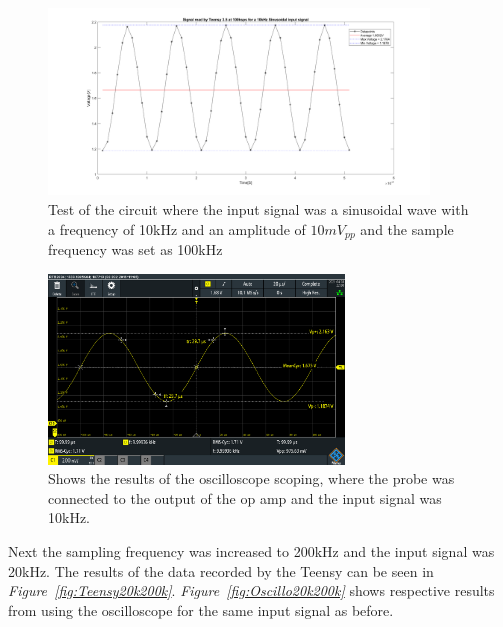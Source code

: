 \begin{figure}[h]
    \centering
    \includegraphics[width=0.9\textwidth]{graphics/10kin_100ksampl.png}
    \caption{Test of the circuit where the input signal was a sinusoidal wave with a frequency of 10kHz and an amplitude of $10mV_{pp}$ and the sample frequency was set as 100kHz}
    \label{fig:Teensy10k100k}
\end{figure}

\begin{figure}[h]
    \centering
    \includegraphics[width=0.7\textwidth]{graphics/10k10mvPP100ksamp.PNG}
    \caption{Shows the results of the oscilloscope scoping, where the probe was connected to the output of the op amp and the input signal was 10kHz.}
    \label{fig:Oscillo10k100k}
\end{figure}

Next the sampling frequency was increased to 200kHz and the input signal was 20kHz.
The results of the data recorded by the Teensy can be seen in \textit{Figure~\ref{fig:Teensy20k200k}}.
\textit{Figure~\ref{fig:Oscillo20k200k}} shows respective results from using the oscilloscope for the same input signal as before.

